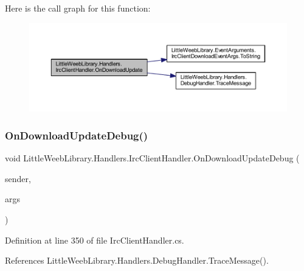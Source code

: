 Here is the call graph for this function\+:\nopagebreak
\begin{figure}[H]
\begin{center}
\leavevmode
\includegraphics[width=350pt]{class_little_weeb_library_1_1_handlers_1_1_irc_client_handler_afef5cc2f76989366cb52ffa7d5a78752_cgraph}
\end{center}
\end{figure}
\mbox{\label{class_little_weeb_library_1_1_handlers_1_1_irc_client_handler_abdc8785a2452e7a1d496c44a424d1812}} 
\subsubsection{\texorpdfstring{On\+Download\+Update\+Debug()}{OnDownloadUpdateDebug()}}
{\footnotesize\ttfamily void Little\+Weeb\+Library.\+Handlers.\+Irc\+Client\+Handler.\+On\+Download\+Update\+Debug (\begin{DoxyParamCaption}\item[{object}]{sender,  }\item[{D\+C\+C\+Debug\+Message\+Args}]{args }\end{DoxyParamCaption})\hspace{0.3cm}{\ttfamily [private]}}



Definition at line 350 of file Irc\+Client\+Handler.\+cs.



References Little\+Weeb\+Library.\+Handlers.\+Debug\+Handler.\+Trace\+Message().


